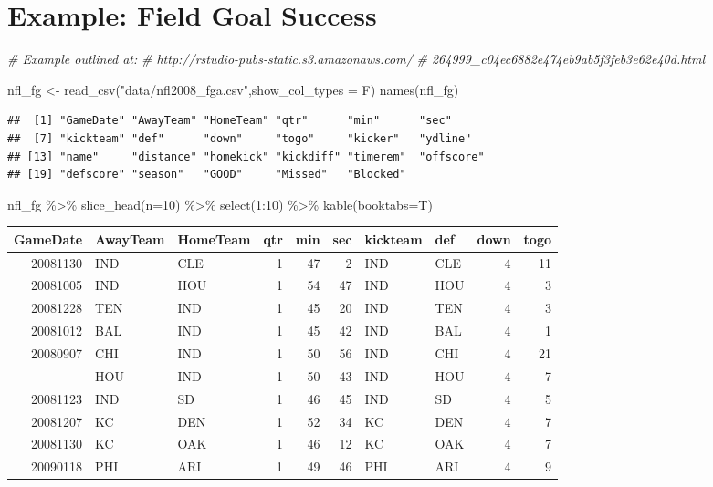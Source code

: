 \documentclass[
  11pt,
]{book}
\newenvironment{Shaded}{\begin{snugshade}}{\end{snugshade}}
\newcommand{\AttributeTok}[1]{\textcolor[rgb]{0.77,0.63,0.00}{#1}}
\newcommand{\CommentTok}[1]{\textcolor[rgb]{0.56,0.35,0.01}{\textit{#1}}}
\newcommand{\DecValTok}[1]{\textcolor[rgb]{0.00,0.00,0.81}{#1}}
\newcommand{\FunctionTok}[1]{\textcolor[rgb]{0.00,0.00,0.00}{#1}}
\newcommand{\NormalTok}[1]{#1}
\newcommand{\OtherTok}[1]{\textcolor[rgb]{0.56,0.35,0.01}{#1}}
\newcommand{\SpecialCharTok}[1]{\textcolor[rgb]{0.00,0.00,0.00}{#1}}
\newcommand{\StringTok}[1]{\textcolor[rgb]{0.31,0.60,0.02}{#1}}
\theoremstyle{definition}
\theoremstyle{definition}
\theoremstyle{definition}
\theoremstyle{definition}
\theoremstyle{remark}
\begin{document}
\hypertarget{example-field-goal-success}{%
\section{Example: Field Goal Success}\label{example-field-goal-success}}

\begin{Shaded}
\begin{Highlighting}[]
\CommentTok{\# Example outlined at:}
\CommentTok{\# http://rstudio{-}pubs{-}static.s3.amazonaws.com/}
\CommentTok{\# 264999\_c04ec6882e474eb9ab5f3feb3e62e40d.html}

\NormalTok{nfl\_fg }\OtherTok{\textless{}{-}} \FunctionTok{read\_csv}\NormalTok{(}\StringTok{"data/nfl2008\_fga.csv"}\NormalTok{,}\AttributeTok{show\_col\_types =}\NormalTok{ F)}
\FunctionTok{names}\NormalTok{(nfl\_fg)}
\end{Highlighting}
\end{Shaded}

\begin{verbatim}
##  [1] "GameDate" "AwayTeam" "HomeTeam" "qtr"      "min"      "sec"     
##  [7] "kickteam" "def"      "down"     "togo"     "kicker"   "ydline"  
## [13] "name"     "distance" "homekick" "kickdiff" "timerem"  "offscore"
## [19] "defscore" "season"   "GOOD"     "Missed"   "Blocked"
\end{verbatim}

\begin{Shaded}
\begin{Highlighting}[]
\NormalTok{nfl\_fg }\SpecialCharTok{\%\textgreater{}\%} 
  \FunctionTok{slice\_head}\NormalTok{(}\AttributeTok{n=}\DecValTok{10}\NormalTok{) }\SpecialCharTok{\%\textgreater{}\%} 
  \FunctionTok{select}\NormalTok{(}\DecValTok{1}\SpecialCharTok{:}\DecValTok{10}\NormalTok{) }\SpecialCharTok{\%\textgreater{}\%} 
  \FunctionTok{kable}\NormalTok{(}\AttributeTok{booktabs=}\NormalTok{T)}
\end{Highlighting}
\end{Shaded}

\begin{tabular}{rllrrrllrr}
\toprule
GameDate & AwayTeam & HomeTeam & qtr & min & sec & kickteam & def & down & togo\\
\midrule
20081130 & IND & CLE & 1 & 47 & 2 & IND & CLE & 4 & 11\\
20081005 & IND & HOU & 1 & 54 & 47 & IND & HOU & 4 & 3\\
20081228 & TEN & IND & 1 & 45 & 20 & IND & TEN & 4 & 3\\
20081012 & BAL & IND & 1 & 45 & 42 & IND & BAL & 4 & 1\\
20080907 & CHI & IND & 1 & 50 & 56 & IND & CHI & 4 & 21\\
\addlinespace
20081116 & HOU & IND & 1 & 50 & 43 & IND & HOU & 4 & 7\\
20081123 & IND & SD & 1 & 46 & 45 & IND & SD & 4 & 5\\
20081207 & KC & DEN & 1 & 52 & 34 & KC & DEN & 4 & 7\\
20081130 & KC & OAK & 1 & 46 & 12 & KC & OAK & 4 & 7\\
20090118 & PHI & ARI & 1 & 49 & 46 & PHI & ARI & 4 & 9\\
\bottomrule
\end{tabular}
\end{document}
